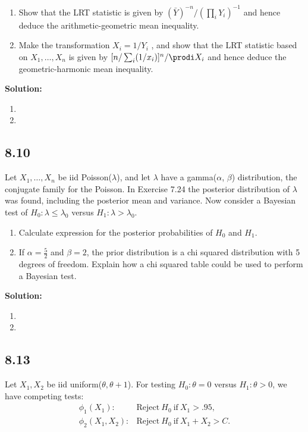 \documentclass[11pt]{article}
\newcommand{\Sol}{\par {\bf Solution:}}
\newcommand{\sample}[1]{#1_1 , \dots , #1_n}
\begin{document}
\begin{enumerate}[label=(\alph*)]
    \item Show that the LRT statistic is given by $(\bar Y)^{-n} /(\prod_i Y_i )^{-1}$ and hence deduce the arithmetic-geometric mean inequality.
    \item Make the transformation $X_i = 1 / Y_i$ , and show that the LRT statistic based on $\sample{X}$ is given by $[n/\sum_i (1/x_i)]^n /\prodi X_i$ and hence deduce the geometric-harmonic mean inequality.
\end{enumerate}

\Sol

\begin{enumerate}[label=(\alph*)]
    \item
    \item
\end{enumerate}

\subsection*{8.10}

Let $\sample{X}$ be iid Poisson($\lambda$), and let $\lambda$ have a gamma($\alpha$, $\beta$) distribution, the conjugate family for the Poisson. In Exercise 7.24 the posterior distribution of $\lambda$ was found, including the posterior mean and variance. Now consider a Bayesian test of
$H_0: \lambda \le \lambda_0$ versus $H_1: \lambda > \lambda_0$.


\begin{enumerate}[label=(\alph*)]
    \item Calculate expression for the posterior probabilities of $H_0$ and $H_1$.
    \item If $\alpha = \frac{5}{2}$ and $\beta = 2$, the prior distribution is a chi squared distribution with 5 degrees of freedom. Explain how a chi squared table could be used to perform a Bayesian test.
\end{enumerate}

\Sol

\begin{enumerate}[label=(\alph*)]
    \item
    \item
\end{enumerate}

\subsection*{8.13}
Let $X_1, X_2$ be iid uniform($\theta, \theta + 1$). For testing $H_0: \theta = 0$ versus $H_1: \theta > 0$, we have competing tests:
\begin{align*}
    \phi_1(X_1): &\text{Reject} ~H_0 ~\text{if}~ X_1 > .95, \\ 
    \phi_2(X_1, X_2): &\text{Reject} ~H_0 ~\text{if}~ X_1 + X_2 > C.    
\end{align*}
\end{document}
